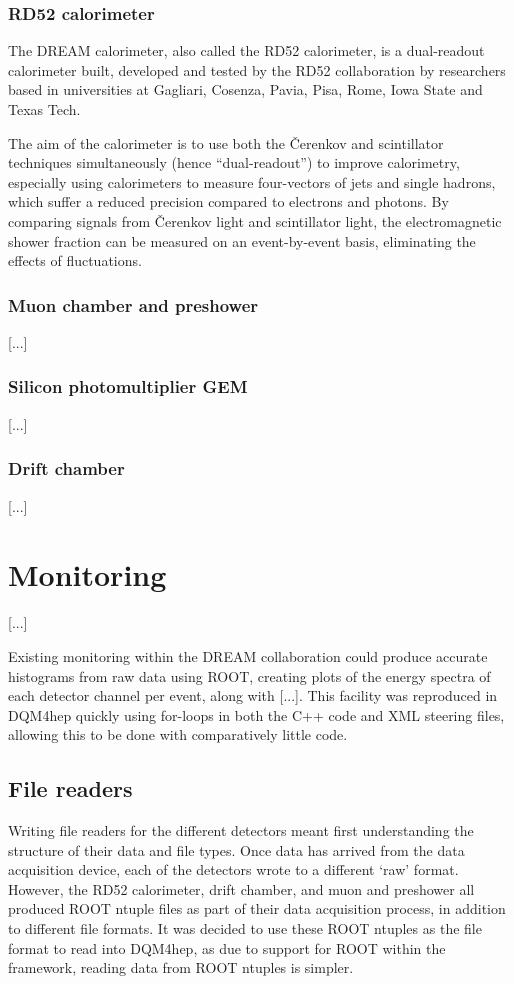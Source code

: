 \subsubsection{RD52 calorimeter} %
The \acrfull{DREAM} calorimeter, also called the RD52 calorimeter, is a dual-readout calorimeter built, developed and tested by the RD52 collaboration by researchers based in universities at Gagliari, Cosenza, Pavia, Pisa, Rome, Iowa State and Texas Tech. 

The aim of the calorimeter is to use both the \v{C}erenkov and scintillator techniques simultaneously (hence ``dual-readout'') to improve calorimetry, especially using calorimeters to measure four-vectors of jets and single hadrons, which suffer a reduced precision compared to electrons and photons. By comparing signals from \v{C}erenkov light and scintillator light, the electromagnetic shower fraction can be measured on an event-by-event basis, eliminating the effects of fluctuations. %

\subsubsection{Muon chamber and preshower}
[...]

\subsubsection{Silicon photomultiplier GEM}
[...]

\subsubsection{Drift chamber}
[...]

\section{Monitoring}
[...]

Existing monitoring within the DREAM collaboration could produce accurate histograms from raw data using ROOT, creating plots of the energy spectra of each detector channel per event, along with [...]. This facility was reproduced in DQM4hep quickly using for-loops in both the C++ code and XML steering files, allowing this to be done with comparatively little code.

\subsection{File readers}
Writing file readers for the different detectors meant first understanding the structure of their data and file types. Once data has arrived from the data acquisition device, each of the detectors wrote to a different `raw' format. However, the RD52 calorimeter, drift chamber, and muon and preshower all produced ROOT ntuple files as part of their data acquisition process, in addition to different file formats. It was decided to use these ROOT ntuples as the file format to read into DQM4hep, as due to support for ROOT within the framework, reading data from ROOT ntuples is simpler.

